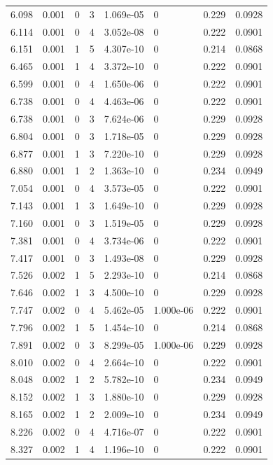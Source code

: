 \documentclass[preview]{standalone}
\begin{document}
{{{\begin{tabular}{L{1.2cm}C{1.2cm} C{0.3cm}C{0.5cm} C{1.4cm}C{1.4cm} C{1.4cm}C{1.4cm}}
  6.098  &  0.001  & 0     &  3 &  1.069e-05  & 0  & 0.229 &  0.0928   \\ 
  6.114  &  0.001  & 0     &  4 &  3.052e-08  & 0  & 0.222 &  0.0901   \\ 
  6.151  &  0.001  & 1     &  5 &  4.307e-10  & 0  & 0.214 &  0.0868   \\ 
  6.465  &  0.001  & 1     &  4 &  3.372e-10  & 0  & 0.222 &  0.0901   \\ 
  6.599  &  0.001  & 0     &  4 &  1.650e-06  & 0  & 0.222 &  0.0901   \\ 
  6.738  &  0.001  & 0     &  4 &  4.463e-06  & 0  & 0.222 &  0.0901   \\ 
  6.738  &  0.001  & 0     &  3 &  7.624e-06  & 0  & 0.229 &  0.0928   \\ 
  6.804  &  0.001  & 0     &  3 &  1.718e-05  & 0  & 0.229 &  0.0928   \\ 
  6.877  &  0.001  & 1     &  3 &  7.220e-10  & 0  & 0.229 &  0.0928   \\ 
  6.880  &  0.001  & 1     &  2 &  1.363e-10  & 0  & 0.234 &  0.0949   \\ 
  7.054  &  0.001  & 0     &  4 &  3.573e-05  & 0  & 0.222 &  0.0901   \\ 
  7.143  &  0.001  & 1     &  3 &  1.649e-10  & 0  & 0.229 &  0.0928   \\ 
  7.160  &  0.001  & 0     &  3 &  1.519e-05  & 0  & 0.229 &  0.0928   \\ 
  7.381  &  0.001  & 0     &  4 &  3.734e-06  & 0  & 0.222 &  0.0901   \\ 
  7.417  &  0.001  & 0     &  3 &  1.493e-08  & 0  & 0.229 &  0.0928   \\ 
  7.526  &  0.002  & 1     &  5 &  2.293e-10  & 0  & 0.214 &  0.0868   \\ 
  7.646  &  0.002  & 1     &  3 &  4.500e-10  & 0  & 0.229 &  0.0928   \\ 
  7.747  &  0.002  & 0     &  4 &  5.462e-05  & 1.000e-06  & 0.222 &  0.0901   \\ 
  7.796  &  0.002  & 1     &  5 &  1.454e-10  & 0  & 0.214 &  0.0868   \\ 
  7.891  &  0.002  & 0     &  3 &  8.299e-05  & 1.000e-06  & 0.229 &  0.0928   \\ 
  8.010  &  0.002  & 0     &  4 &  2.664e-10  & 0  & 0.222 &  0.0901   \\ 
  8.048  &  0.002  & 1     &  2 &  5.782e-10  & 0  & 0.234 &  0.0949   \\ 
  8.152  &  0.002  & 1     &  3 &  1.880e-10  & 0  & 0.229 &  0.0928   \\ 
  8.165  &  0.002  & 1     &  2 &  2.009e-10  & 0  & 0.234 &  0.0949   \\ 
  8.226  &  0.002  & 0     &  4 &  4.716e-07  & 0  & 0.222 &  0.0901   \\ 
  8.327  &  0.002  & 1     &  4 &  1.196e-10  & 0  & 0.222 &  0.0901   \\ 
\hline 
\end{tabular} 

}}}
\end{document}
